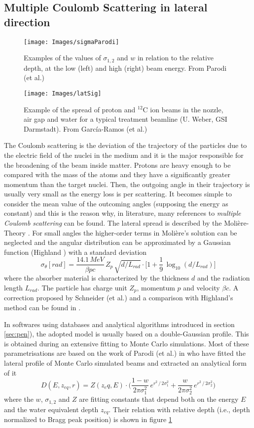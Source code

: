 \documentclass[12pt, a4paper, twoside]{book}
\begin{document}
\subsection{Multiple Coulomb Scattering in lateral direction}
\label{sec:mcs}
\begin{figure}[!t]
\centering
\texttt{[image: Images/sigmaParodi]}
\caption{Examples of the values of $\sigma_{1,2}$ and $w$ in relation to the relative depth, at the low (left) and high (right) beam energy. From Parodi (et al.) \cite{par:latspr}}
\label{fig:sigPar}
\end{figure}
\begin{figure}[!t]
\texttt{[image: Images/latSig]}
\caption{Example of the spread of proton and $^{12}$C ion beams in the nozzle, air gap and water for a typical treatment beamline (U. Weber, GSI Darmstadt). From García-Ramos (et al.) \cite{garc:nucu}}
\label{fig:latSig1}
\end{figure}
The Coulomb scattering is the deviation of the trajectory of the particles due to the electric field of the nuclei in the medium and it is the major responsible for the broadening of the beam inside matter. Protons are heavy enough to be compared with the mass of the atoms and they have a significantly greater momentum than the target nuclei. Then, the outgoing angle in their trajectory is usually very small as the energy loss is per scattering. It becomes simple to consider the mean value of the outcoming angles (supposing the energy as constant) and this is the reason why, in literature, many references to \emph{multiple Coulomb scattering} can be found.
The lateral spread is described by the Molière-Theory \cite{mol:mcs}. For small angles the higher-order terms in Molière's solution can be neglected and the angular distribution can be approximated by a Gaussian function (Highland \cite{high:mcs}) with a standard deviation 
\[
\sigma_\theta [rad]= \frac{14.1\,MeV}{\beta pc}\, Z_p\, \sqrt{d/L_{rad}} \cdot \bigg[ 1 + \frac{1}{9}\,\log_{10} (d/L_{rad} )\bigg]
\]
where the absorber material is characterized by the thickness $d$ and the radiation length $L_{rad}$. The particle has charge unit $Z_p$, momentum $p$ and velocity $\beta c$.
A correction proposed by Schneider (et al.) and a comparison with Highland's method can be found in \cite{schn:mcs}. 

In softwares using databases and analytical algorithms introduced in section \ref{sec:pen}), the adopted model is usually based on a double-Gaussian profile. This is obtained during an extensive fitting to Monte Carlo simulations. Most of these parametrisations are based on the work of Parodi (et al.) in \cite{par:latspr} who have fitted the lateral profile of Monte Carlo simulated beams and extracted an analytical form of it
\[
D(E,z_{eq},r) = Z(z_eq,E) \cdot \bigg(  \frac{1-w}{2\pi\sigma_1^2}\,e^{r^2\,/\,2\sigma_1^2} + \frac{w}{2\pi\sigma_2^2}\,e^{r^2\,/\,2\sigma_2^2} \bigg)
\]
where the $w$, $\sigma_{1,2}$ and $Z$ are fitting constants that depend both on the energy $E$ and the water equivalent depth $z_{eq}$. Their relation with relative depth (i.e., depth normalized to Bragg peak position) is shown in figure \ref{fig:sigPar}
\end{document}
